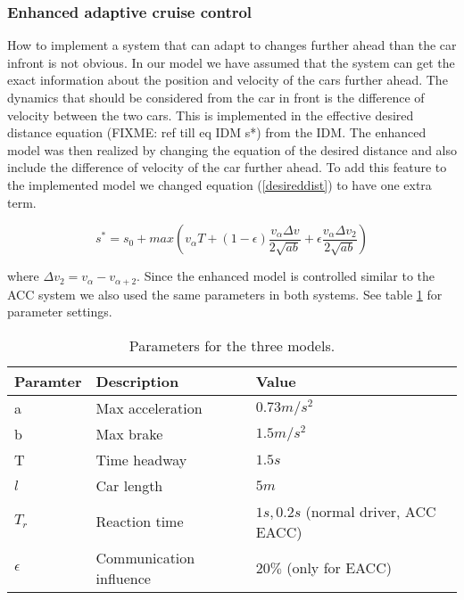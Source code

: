 \subsubsection {Enhanced adaptive cruise control}
How to implement a system that can adapt to changes further ahead than the
car infront is not obvious. In our model we have assumed that the system
can get the exact information about the position and velocity of the cars
further ahead.  The dynamics that should be considered from the car in front
is the difference of velocity between the two cars. This is implemented in
the effective desired distance equation (FIXME: ref till eq IDM s*) from
the IDM. The enhanced model was then realized by changing the equation of
the desired distance and also include the difference of velocity of the
car further ahead. To add this feature to the implemented model we changed
equation (\ref{desireddist}) to have one extra term.

\begin{equation}
s^\ast = s_0 + max(v_\alpha T + (1-\epsilon
)\frac{v_\alpha \Delta v}{2\sqrt{ab}} + \epsilon \frac{v_\alpha \Delta
v_2}{2\sqrt{ab}})
\end{equation}

where $ \Delta v_2 = v_\alpha - v_{\alpha +2} $.  Since the enhanced model
is controlled similar to the ACC system we also used the same parameters in
both systems. See table \ref{config} for parameter settings.

\begin{center}
\begin{table}[H]
\begin{tabular}{| l | l | l |} \hline
Paramter & Description & Value\\ \hline
a & Max acceleration & $ 0.73 \unit{m/s^2} $\\ \hline
b & Max brake & $ 1.5 \unit{m/s^2} $\\ \hline
T & Time headway & $ 1.5 \unit{s} $ \\ \hline
$ l $ & Car length & $ 5 \unit{m} $ \\ \hline
$ T_r $ & Reaction time & $ 1 \unit{s}, 0.2 \unit{s} $ (normal driver, ACC EACC) \\ \hline
$ \epsilon $ & Communication influence & $ 20 \% $ (only for EACC) \\ \hline
\end{tabular}
\caption{\label{config} Parameters for the three models.}
\end{table}
\end{center}


